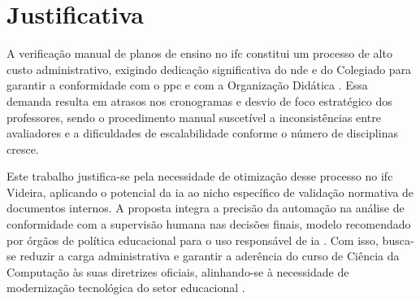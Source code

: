 \section{Justificativa}
A verificação manual de planos de ensino no \gls{ifc} constitui um processo de alto custo administrativo, exigindo dedicação significativa do \gls{nde} e do Colegiado para garantir a conformidade com o \gls{ppc} e com a Organização Didática \cite{ifc2022}. Essa demanda resulta em atrasos nos cronogramas e desvio de foco estratégico dos professores, sendo o procedimento manual suscetível a inconsistências entre avaliadores e a dificuldades de escalabilidade conforme o número de disciplinas cresce.

Este trabalho justifica-se pela necessidade de otimização desse processo no \gls{ifc} Videira, aplicando o potencial da \gls{ia} ao nicho específico de validação normativa de documentos internos. A proposta integra a precisão da automação na análise de conformidade com a supervisão humana nas decisões finais, modelo recomendado por órgãos de política educacional para o uso responsável de \gls{ia} \cite{USDeptEd2023}. Com isso, busca-se reduzir a carga administrativa e garantir a aderência do curso de Ciência da Computação às suas diretrizes oficiais, alinhando-se à necessidade de modernização tecnológica do setor educacional \cite{ADIGUZEL2023}.

